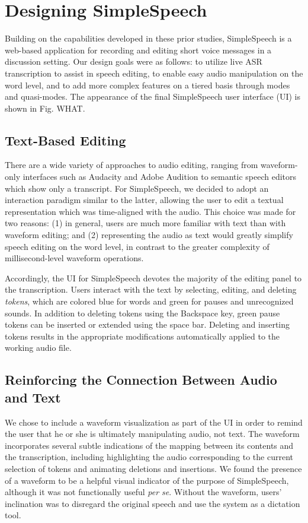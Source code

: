 \section{Designing SimpleSpeech}
Building on the capabilities developed in these prior studies, SimpleSpeech is a web-based application for recording and editing short voice messages in a discussion setting.
Our design goals were as follows: to utilize live ASR transcription to assist in speech editing, to enable easy audio manipulation on the word level, and to add more complex features on a tiered basis through modes and quasi-modes.
The appearance of the final SimpleSpeech user interface (UI) is shown in Fig. WHAT.

\subsection{Text-Based Editing}
There are a wide variety of approaches to audio editing, ranging from waveform-only interfaces such as Audacity and Adobe Audition to semantic speech editors \cite{whittaker_semantic} which show only a transcript. 
For SimpleSpeech, we decided to adopt an interaction paradigm similar to the latter, allowing the user to edit a textual representation which was time-aligned with the audio.
This choice was made for two reasons: (1) in general, users are much more familiar with text than with waveform editing; and (2) representing the audio as text would greatly simplify speech editing on the word level, in contrast to the greater complexity of millisecond-level waveform operations. 

Accordingly, the UI for SimpleSpeech devotes the majority of the editing panel to the transcription. 
Users interact with the text by selecting, editing, and deleting \textit{tokens}, which are colored blue for words and green for pauses and unrecognized sounds. 
In addition to deleting tokens using the Backspace key, green pause tokens can be inserted or extended using the space bar.
Deleting and inserting tokens results in the appropriate modifications automatically applied to the working audio file.

\subsection{Reinforcing the Connection Between Audio and Text}
We chose to include a waveform visualization as part of the UI in order to remind the user that he or she is ultimately manipulating audio, not text. The waveform incorporates several subtle indications of the mapping between its contents and the transcription, including highlighting the audio corresponding to the current selection of tokens and animating deletions and insertions.
We found the presence of a waveform to be a helpful visual indicator of the purpose of SimpleSpeech, although it was not functionally useful \textit{per se}.
Without the waveform, users' inclination was to disregard the original speech and use the system as a dictation tool.

